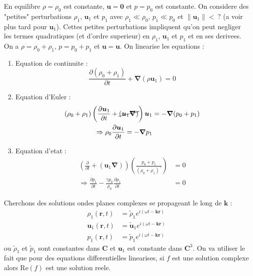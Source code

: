 En equilibre $\rho =\rho_{0}$ est constante, $\boldsymbol{u}=\boldsymbol{0}$ et $p=p_{0}$ est constante. On considere des "petites" perturbations $\rho_{1}$, $\boldsymbol{u}_{1}$ et $p_{1}$ avec $\rho_{1}\ll \rho_{0}$, $p_{1}\ll p_{0}$ et $\lVert \boldsymbol{u}_{1} \rVert< ~?$ (a voir plus tard pour $\boldsymbol{u}_{1}$). Cettes petites perturbations impliquent qu'on peut negliger les termes quadratiques (et d'ordre superieur) en $\rho_{1}$, $\boldsymbol{u}_{1}$ et $p_{1}$ et en ses derivees. On a $\rho=\rho_{0}+\rho_{1}$, $p=p_{0}+p_{1}$ et $\boldsymbol{u}=\boldsymbol{u}$. On linearise les equations :
\begin{enumerate}
\item \label{cont} Equation de continuite : 
$$
\frac{ \partial (\rho_{0}+\rho_{1}) }{ \partial t }+\boldsymbol{\nabla}(\rho \boldsymbol{u}_{1})=0 
$$
\item \label{euler} Equation d'Euler : 
\begin{align*}
(\rho_{0}+\rho_{1} )\left( \frac{ \partial \boldsymbol{u}_{1} }{ \partial t } +\cancel{ (\boldsymbol{u}_{1}\boldsymbol{\nabla}) } \right)\boldsymbol{u}_{1} & =-\boldsymbol{\nabla}(p_{0}+p_{1}) \\
  \Rightarrow \rho_{0}\frac{ \partial \boldsymbol{u}_{1} }{ \partial t } = -\boldsymbol{\nabla}p_{1}  
\end{align*}
\item \label{etat} Equation d'etat :
\begin{align*}
\left( \frac{ \partial  }{ \partial t } +(\boldsymbol{u}_{1}\boldsymbol{\nabla}) \right)\left( \frac{p_{0}+p_{1}}{(\rho_{0}+\rho_{1})^{\gamma}} \right) & =0 \\
 \Rightarrow \frac{ \partial p_{1} }{ \partial t } -\frac{\gamma p_{0}}{\rho_{0}} \frac{ \partial p_{1} }{ \partial t }  & =0
\end{align*}
\end{enumerate}

Cherchons des solutions ondes planes complexes se propageant le long de $\boldsymbol{k}$ :
\begin{align*}
\rho_{1} (\boldsymbol{r},t) & =\tilde{\rho}_{1}e^{i(\omega t-\boldsymbol{k}\boldsymbol{r})} \\
\boldsymbol{u}_{1}(\boldsymbol{r},t) & =\tilde{\boldsymbol{u}}_{1}e^{i(\omega t-\boldsymbol{kr})} \\
p_{1}(\boldsymbol{r},t) & =\tilde{p}_{1}e^{i(\omega t-\boldsymbol{kr})}
\end{align*}
ou $\tilde{\rho}_{1}$ et $\tilde{p}_{1}$ sont constantes dans $\mathbf{C}$ et $\boldsymbol{u}_{1}$ est constante dans $\mathbf{C}^{3}$. On va utiliser le fait que pour des equations differentielles linearises, si $f$ est une solution complexe alors $\mathrm{Re}(f)$ est une solution reele.

